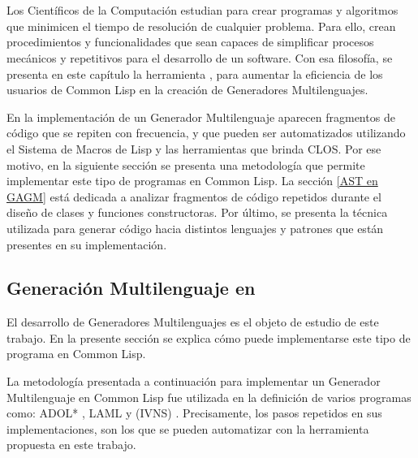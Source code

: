 \chapter{\gagm}
\label{chap:GAGM}




Los Científicos de la Computación estudian para crear programas y algoritmos que minimicen el tiempo de resolución de cualquier problema. Para ello, crean procedimientos y funcionalidades que sean capaces de simplificar procesos mecánicos y repetitivos para el desarrollo de un software. Con esa filosofía, se presenta en este capítulo la herramienta \gagm, para aumentar la eficiencia de los usuarios de Common Lisp en la creación de Generadores Multilenguajes.

En la implementación de un Generador Multilenguaje aparecen fragmentos de código que se repiten con frecuencia, y que pueden ser automatizados utilizando el Sistema de Macros de Lisp y las herramientas que brinda CLOS.  Por ese motivo, en la siguiente sección se presenta una metodología que permite implementar este tipo de programas en Common Lisp. La sección \ref{AST en GAGM} está dedicada a analizar fragmentos de código repetidos durante el diseño de clases y funciones constructoras. Por último, se presenta  la técnica utilizada para generar código hacia distintos lenguajes y patrones que están presentes en su implementación. 

\section{Generación Multilenguaje en \gagm}
\label{chap:Generación Multilenguaje en Gagm}
El desarrollo de Generadores Multilenguajes es el objeto de estudio de este trabajo. En la presente sección se explica cómo puede implementarse este tipo de programa en Common Lisp. 

La metodología presentada a continuación para implementar un Generador Multilenguaje en Common Lisp fue utilizada en la definición de varios programas como: ADOL* \cite{Adol*}, LAML \cite{hoyos} y (IVNS) \cite{cami}. Precisamente, los pasos repetidos en sus implementaciones, son los que se pueden automatizar con la herramienta propuesta en este trabajo.

